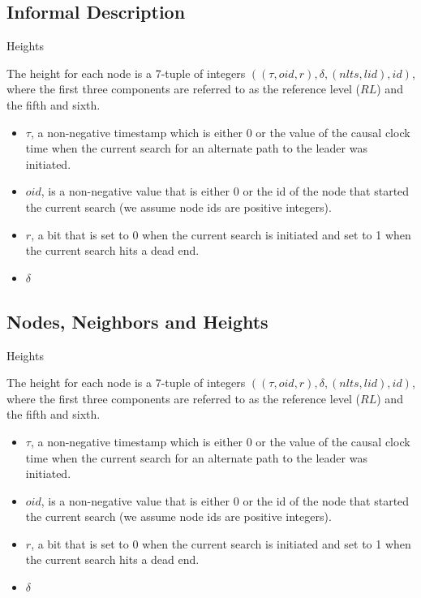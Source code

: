 \documentclass{beamer}
\begin{document}
\subsection{Informal Description}
\begin{frame}{Heights}

The height for each node is a 7-tuple of integers $((\tau , oid, r), \delta, (nlts, lid), id)$, where the first three components are referred to as the reference level ($RL$) and the fifth and sixth.

\begin{itemize}
	\item $\tau$, a non-negative timestamp which is either 0 or the value of the causal clock time when the current search for an alternate path to the leader was initiated.
	\item $oid$, is a non-negative value that is either 0 or the id of the node that started the current search (we assume node ids are positive integers).
	\item $r$, a bit that is set to 0 when the current search is initiated and set to 1 when the current search hits a dead end.
	\item $\delta$

\end{itemize}

\end{frame}

\subsection{Nodes, Neighbors and Heights}
\begin{frame}{Heights}

The height for each node is a 7-tuple of integers $((\tau , oid, r), \delta, (nlts, lid), id)$, where the first three components are referred to as the reference level ($RL$) and the fifth and sixth.

\begin{itemize}
	\item $\tau$, a non-negative timestamp which is either 0 or the value of the causal clock time when the current search for an alternate path to the leader was initiated.
	\item $oid$, is a non-negative value that is either 0 or the id of the node that started the current search (we assume node ids are positive integers).
	\item $r$, a bit that is set to 0 when the current search is initiated and set to 1 when the current search hits a dead end.
	\item $\delta$

\end{itemize}

\end{frame}
\end{document}
